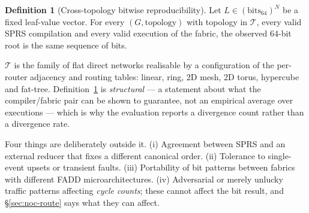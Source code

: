 \documentclass[journal,10pt]{IEEEtran}
\theoremstyle{plain}
\theoremstyle{definition}
\newtheorem{definition}{Definition}
\theoremstyle{remark}
\newcommand{\sprs}{\textsc{SPRS}}
\newcommand{\T}{\ensuremath{\mathcal{T}}}
\begin{document}
\begin{definition}[Cross-topology bitwise reproducibility]\label{def:ctbr}
Let $L \in (\mathrm{bits}_{64})^N$ be a fixed leaf-value vector. For every
$(G,\text{topology})$ with topology in $\T$, every valid \sprs{} compilation
and every valid execution of the fabric, the observed 64-bit root is the same
sequence of bits.
\end{definition}

$\T$ is the family of flat direct networks realisable by a configuration of
the per-router adjacency and routing tables: linear, ring, 2D mesh, 2D torus,
hypercube and fat-tree. Definition~\ref{def:ctbr} is \emph{structural} --- a
statement about what the compiler/fabric pair can be shown to guarantee, not
an empirical average over executions --- which is why the evaluation reports
a divergence count rather than a divergence rate.

Four things are deliberately outside it. (i) Agreement between \sprs{} and an
external reducer that fixes a different canonical order. (ii) Tolerance to
single-event upsets or transient faults. (iii) Portability of bit patterns
between fabrics with different FADD microarchitectures. (iv) Adversarial or
merely unlucky traffic patterns affecting \emph{cycle counts}; these cannot
affect the bit result, and \S\ref{sec:noc-route} says what they can affect.
\end{document}
